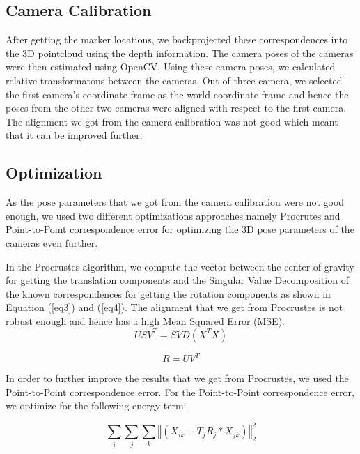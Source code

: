 \documentclass[10pt,twocolumn,letterpaper]{article}
\begin{document}
\subsection{Camera Calibration}
After getting the marker locations, we backprojected these correspondences into the 3D pointcloud using the depth information. The camera poses of the cameras were then estimated using OpenCV. Using these camera poses, we calculated relative transformatons between the cameras. Out of three camera, we selected the first camera's coordinate frame as the world coordinate frame and hence the poses from the other two cameras were aligned with respect to the first camera. The alignment we got from the camera calibration was not good which meant that it can be improved further.

\subsection{Optimization}
As the pose parameters that we got from the camera calibration were not good enough, we used two different optimizations approaches namely Procrutes and Point-to-Point correspondence error for optimizing the 3D pose parameters of the cameras even further.
 
In the Procrustes algorithm, we compute the vector between the center of gravity for getting the translation components and the Singular Value Decomposition of the known correspondences for getting the rotation components as shown in Equation (\ref{eq3}) and (\ref{eq4}). The alignment that we get from Procrustes is not robust enough and hence has a high Mean Squared Error (MSE).\\

\begin{equation}\label{eq3}
USV^T=SVD(X^TX)
\end{equation}

\begin{equation}\label{eq4}
R=UV^T
\end{equation}

In order to further improve the results that we get from Procrustes, we used the Point-to-Point correspondence error. For the Point-to-Point correspondence error, we optimize for the following energy term:

\begin{equation}\label{eq5}
\sum_{i}\sum_{j}\sum_{k} \left\Vert\left(X_{ik} - T_jR_j*X_{jk}\right)\right\Vert_2^2
\end{equation}
\end{document}
